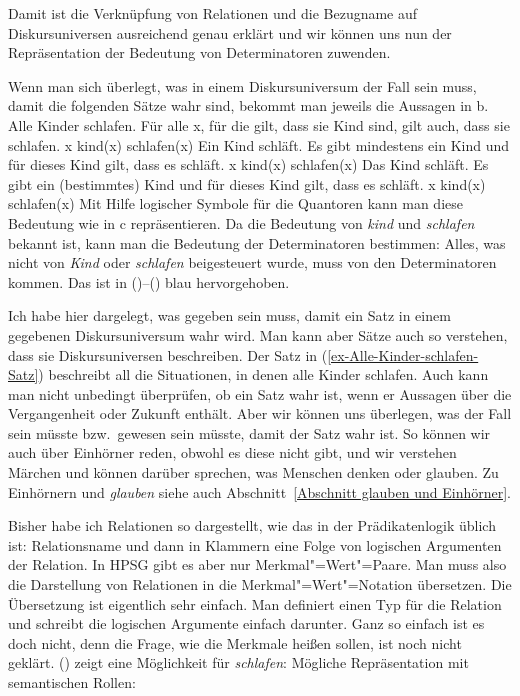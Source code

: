 Damit ist die Verknüpfung von Relationen und die Bezugname auf Diskursuniversen ausreichend genau
erklärt und wir können uns nun der Repräsentation der Bedeutung von Determinatoren zuwenden.

Wenn man sich überlegt, was in einem Diskursuniversum der Fall sein muss, damit die folgenden Sätze
wahr sind, bekommt man jeweils die Aussagen in b.
\eal
\label{ex-Alle-Kinder-schlafen}
\ex\label{ex-Alle-Kinder-schlafen-Satz} Alle Kinder schlafen.
\ex Für alle x, für die gilt, dass sie Kind sind, gilt auch, dass sie schlafen.
\ex \blau{$\forall$}x kind(x) \blau{$\to$} schlafen(x)
\zl
\eal
\ex Ein Kind schläft.
\ex Es gibt mindestens ein Kind und für dieses Kind gilt, dass es schläft.
\ex \blau{$\exists$}x kind(x) \blau{$\wedge$} schlafen(x)
\zl
\eal
\label{ex-Das-Kind-schläft}
\ex Das Kind schläft.
\ex Es gibt ein (bestimmtes) Kind und für dieses Kind gilt, dass es schläft.
\ex \blau{$\iota$}x kind(x) \blau{$\wedge$} schlafen(x)
\zl
Mit Hilfe logischer Symbole für die Quantoren kann man diese Bedeutung wie in c repräsentieren. Da
die Bedeutung von \emph{kind} und \emph{schlafen} bekannt ist, kann man die Bedeutung der
Determinatoren bestimmen: Alles, was nicht von \emph{Kind} oder \emph{schlafen} beigesteuert wurde,
muss von den Determinatoren kommen. Das ist in ()--() blau hervorgehoben.

Ich habe hier dargelegt, was gegeben sein muss, damit ein Satz in einem gegebenen Diskursuniversum
wahr wird. Man kann aber Sätze auch so verstehen, dass sie Diskursuniversen beschreiben. Der Satz in
(\ref{ex-Alle-Kinder-schlafen-Satz}) beschreibt all die Situationen, in denen alle Kinder
schlafen. Auch kann man nicht unbedingt überprüfen, ob ein Satz wahr ist, \zb wenn er Aussagen über
die Vergangenheit oder Zukunft enthält. Aber wir können uns überlegen, was der Fall sein müsste
bzw.\ gewesen sein müsste, damit der Satz wahr ist. So können wir auch über Einhörner reden, obwohl
es diese nicht gibt, und wir verstehen Märchen und können darüber sprechen, was Menschen denken oder
glauben. Zu Einhörnern und \emph{glauben} siehe auch Abschnitt~\ref{Abschnitt glauben und Einhörner}.

Bisher habe ich Relationen so dargestellt, wie das in der Prädikatenlogik üblich ist: Relationsname
und dann in Klammern eine Folge von logischen Argumenten der Relation. In HPSG gibt es aber nur
Merkmal"=Wert"=Paare. Man muss also die Darstellung von Relationen in die Merkmal"=Wert"=Notation
übersetzen. Die Übersetzung ist eigentlich sehr einfach. Man definiert einen Typ für die Relation
und schreibt die logischen Argumente einfach darunter. Ganz so einfach ist es doch nicht, denn die
Frage, wie die Merkmale heißen sollen, ist noch nicht geklärt. () zeigt eine Möglichkeit für \emph{schlafen}:
\ea
Mögliche Repräsentation mit semantischen Rollen:\\
\z

